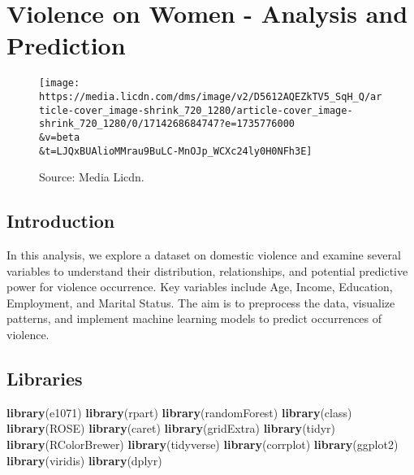 \documentclass[
]{article}
\author{Abhijith R Upadhya}
\date{2025-08-24}
\newenvironment{Shaded}{\begin{snugshade}}{\end{snugshade}}
\newcommand{\FunctionTok}[1]{\textcolor[rgb]{0.13,0.29,0.53}{\textbf{#1}}}
\newcommand{\NormalTok}[1]{#1}
\begin{document}
\hypertarget{violence-on-women---analysis-and-prediction}{%
\section{\texorpdfstring{\textbf{Violence on Women - Analysis and
Prediction}}{Violence on Women - Analysis and Prediction}}\label{violence-on-women---analysis-and-prediction}}

\begin{figure}
\centering
\texttt{[image: https://media.licdn.com/dms/image/v2/D5612AQEZkTV5\_SqH\_Q/article-cover\_image-shrink\_720\_1280/article-cover\_image-shrink\_720\_1280/0/1714268684747?e=1735776000\\\&v=beta\\\&t=LJQxBUAlioMMrau9BuLC-MnOJp\_WCXc24ly0H0NFh3E]}
\caption{Source: Media Licdn.}
\end{figure}

\hypertarget{introduction}{%
\subsection{Introduction}\label{introduction}}

In this analysis, we explore a dataset on domestic violence and examine
several variables to understand their distribution, relationships, and
potential predictive power for violence occurrence. Key variables
include Age, Income, Education, Employment, and Marital Status. The aim
is to preprocess the data, visualize patterns, and implement machine
learning models to predict occurrences of violence.

\hypertarget{libraries}{%
\subsection{Libraries}\label{libraries}}

\begin{Shaded}
\begin{Highlighting}[]
\FunctionTok{library}\NormalTok{(e1071)}
\FunctionTok{library}\NormalTok{(rpart)}
\FunctionTok{library}\NormalTok{(randomForest)}
\FunctionTok{library}\NormalTok{(class)}
\FunctionTok{library}\NormalTok{(ROSE)}
\FunctionTok{library}\NormalTok{(caret)}
\FunctionTok{library}\NormalTok{(gridExtra)}
\FunctionTok{library}\NormalTok{(tidyr)}
\FunctionTok{library}\NormalTok{(RColorBrewer)}
\FunctionTok{library}\NormalTok{(tidyverse)}
\FunctionTok{library}\NormalTok{(corrplot)}
\FunctionTok{library}\NormalTok{(ggplot2)}
\FunctionTok{library}\NormalTok{(viridis)}
\FunctionTok{library}\NormalTok{(dplyr)}
\end{Highlighting}
\end{Shaded}
\end{document}
